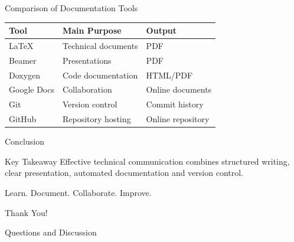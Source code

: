 \documentclass[aspectratio=169,11pt]{beamer}
\begin{document}
\begin{frame}{Comparison of Documentation Tools}

    \centering

    \small
    \begin{tabular}{lll}
        \toprule
        \textbf{Tool} & \textbf{Main Purpose} & \textbf{Output} \\
        \midrule
        LaTeX & Technical documents & PDF \\
        Beamer & Presentations & PDF \\
        Doxygen & Code documentation & HTML/PDF \\
        Google Docs & Collaboration & Online documents \\
        Git & Version control & Commit history \\
        GitHub & Repository hosting & Online repository \\
        \bottomrule
    \end{tabular}

\end{frame}

\begin{frame}{Conclusion}

    \begin{block}{Key Takeaway}
        Effective technical communication combines
        structured writing, clear presentation,
        automated documentation and version control.
    \end{block}

    \vspace{0.4cm}

    \begin{center}
        \Large
        Learn. Document. Collaborate. Improve.
    \end{center}

\end{frame}

\begin{frame}
    \centering
    \Huge Thank You!

    \vspace{0.5cm}

    \Large Questions and Discussion
\end{frame}
\end{document}
